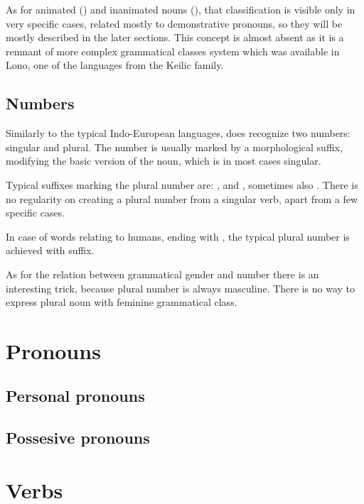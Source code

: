 As for animated (\An{}) and inanimated nouns (\Inan{}), that classification is
visible only in very specific cases, related mostly to demonstrative pronouns,
so they will be mostly described in the later sections. This concept is almost
absent as it is a remnant of more complex grammatical classes system which was
available in Lono, one of the languages from the Keilic family.

\subsection{Numbers}

Similarly to the typical Indo-European languages, \andro does recognize two
numbers: singular and plural. The number is usually marked by a morphological
suffix, modifying the basic version of the noun, which is in most cases
singular.


Typical suffixes marking the plural number are: ,  and ,
sometimes also . There is no regularity on creating a plural number from
a singular verb, apart from a few specific cases.

In case of words relating to humans, ending with , the typical plural
number is achieved with  suffix.

As for the relation between grammatical gender and number there is an
interesting trick, because plural number is always masculine. There is no way to
express plural noun with feminine grammatical class.

\section{Pronouns}

\subsection{Personal pronouns}
\subsection{Possesive pronouns}

\section{Verbs}

